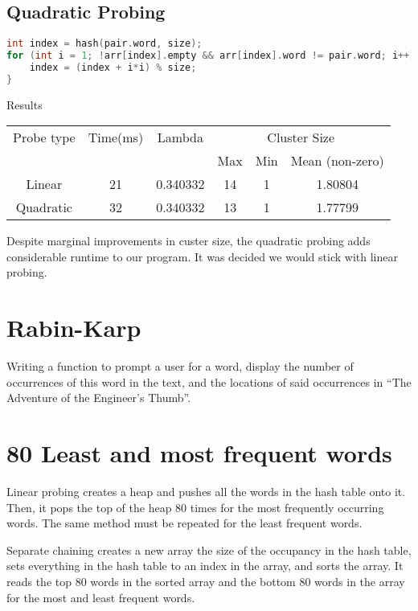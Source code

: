\documentclass[12pt]{article}
\begin{document}
\subsection{Quadratic Probing}
\begin{lstlisting}[language=C++]
int index = hash(pair.word, size);
for (int i = 1; !arr[index].empty && arr[index].word != pair.word; i++) {
    index = (index + i*i) % size;
}
\end{lstlisting}

\begin{center}
Results\\
\begin{tabular}{|c|c|c|c|c|c|}
\hline
Probe type & Time(ms) & Lambda & \multicolumn{3}{|c|}{Cluster Size} \\
 & & & Max & Min & Mean (non-zero) \\
\hline
Linear & 21 & 0.340332 & 14 & 1 & 1.80804\\
Quadratic & 32 & 0.340332 & 13 & 1 & 1.77799\\
\hline
\end{tabular}
\end{center}

Despite marginal improvements in custer size, the quadratic probing adds considerable runtime to our program. It was decided we would stick with linear probing.

\section{Rabin-Karp}
Writing a function to prompt a user for a word, display the number of occurrences of this word in the text, and the locations of said occurrences in “The Adventure of the Engineer’s Thumb”.

\section{80 Least and most frequent words}

Linear probing creates a heap and pushes all the words in the hash table onto it. Then, it pops the top of the heap 80 times for the most frequently occurring words. The same method must be repeated for the least frequent words.

Separate chaining creates a new array the size of the occupancy in the hash table, sets everything in the hash table to an index in the array, and sorts the array. It reads the top 80 words in the sorted array and the bottom 80 words in the array for the most and least frequent words.
\end{document}
